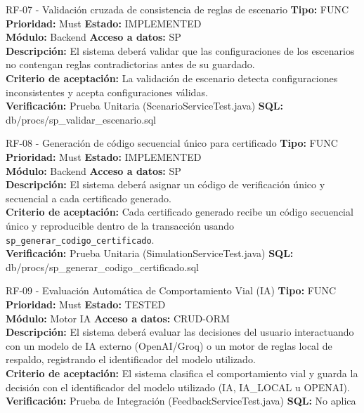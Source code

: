 \documentclass[11pt,a4paper]{article}
\begin{document}
\begin{requisito}{RF-07 - Validación cruzada de consistencia de reglas de escenario}
    \textbf{Tipo:} FUNC \quad \textbf{Prioridad:} Must \quad \textbf{Estado:} IMPLEMENTED \\[0.2cm]
    \textbf{Módulo:} Backend \quad \textbf{Acceso a datos:} SP \\[0.2cm]
    \textbf{Descripción:} El sistema deberá validar que las configuraciones de los escenarios no contengan reglas contradictorias antes de su guardado. \\[0.2cm]
    \textbf{Criterio de aceptación:} La validación de escenario detecta configuraciones inconsistentes y acepta configuraciones válidas. \\[0.2cm]
    \textbf{Verificación:} Prueba Unitaria (ScenarioServiceTest.java) \quad \textbf{SQL:} db/procs/sp\_validar\_escenario.sql
\end{requisito}

\begin{requisito}{RF-08 - Generación de código secuencial único para certificado}
    \textbf{Tipo:} FUNC \quad \textbf{Prioridad:} Must \quad \textbf{Estado:} IMPLEMENTED \\[0.2cm]
    \textbf{Módulo:} Backend \quad \textbf{Acceso a datos:} SP \\[0.2cm]
    \textbf{Descripción:} El sistema deberá asignar un código de verificación único y secuencial a cada certificado generado. \\[0.2cm]
    \textbf{Criterio de aceptación:} Cada certificado generado recibe un código secuencial único y reproducible dentro de la transacción usando \texttt{sp\_generar\_codigo\_certificado}. \\[0.2cm]
    \textbf{Verificación:} Prueba Unitaria (SimulationServiceTest.java) \quad \textbf{SQL:} db/procs/sp\_generar\_codigo\_certificado.sql
\end{requisito}

\begin{requisito}{RF-09 - Evaluación Automática de Comportamiento Vial (IA)}
    \textbf{Tipo:} FUNC \quad \textbf{Prioridad:} Must \quad \textbf{Estado:} TESTED \\[0.2cm]
    \textbf{Módulo:} Motor IA \quad \textbf{Acceso a datos:} CRUD-ORM \\[0.2cm]
    \textbf{Descripción:} El sistema deberá evaluar las decisiones del usuario interactuando con un modelo de IA externo (OpenAI/Groq) o un motor de reglas local de respaldo, registrando el identificador del modelo utilizado. \\[0.2cm]
    \textbf{Criterio de aceptación:} El sistema clasifica el comportamiento vial y guarda la decisión con el identificador del modelo utilizado (IA, IA\_LOCAL u OPENAI). \\[0.2cm]
    \textbf{Verificación:} Prueba de Integración (FeedbackServiceTest.java) \quad \textbf{SQL:} No aplica
\end{requisito}
\end{document}

